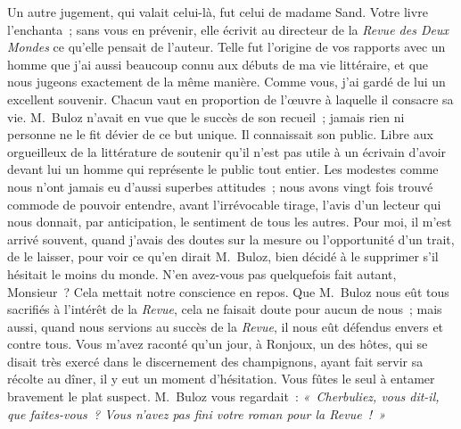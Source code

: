 \documentclass[french,twoside]{book} %
\newcommand\persName[1]{#1}
\newcommand\placeName[1]{#1}
\begin{document}
Un autre jugement, qui valait celui-là, fut celui de madame Sand. Votre livre l’enchanta ; sans vous en prévenir, elle écrivit au directeur de la \emph{Revue des Deux Mondes} ce qu’elle pensait de l’auteur. Telle fut l’origine de vos rapports avec un homme que j’ai aussi beaucoup connu aux débuts de ma vie littéraire, et que nous jugeons exactement de la même manière. Comme vous, j’ai gardé de lui un excellent souvenir. Chacun vaut en proportion de l’œuvre à laquelle il consacre sa vie. {\persName M. Buloz} n’avait en vue que le succès de son recueil ; jamais rien ni personne ne le fit dévier de ce but unique. Il connaissait son public. Libre aux orgueilleux de la littérature de soutenir qu’il n’est pas utile à un écrivain d’avoir devant lui un homme qui représente le public tout entier. Les modestes comme nous n’ont jamais eu d’aussi superbes attitudes ; nous avons vingt fois trouvé commode de pouvoir entendre, avant l’irrévocable tirage, l’avis d’un lecteur qui nous donnait, par anticipation, le sentiment de tous les autres. Pour moi, il m’est arrivé souvent, quand j’avais des doutes sur la mesure ou l’opportunité d’un trait, de le laisser, pour voir ce qu’en dirait {\persName M. Buloz}, bien décidé à le supprimer s’il hésitait le moins du monde. N’en avez-vous pas quelquefois fait autant, Monsieur ? Cela mettait notre conscience en repos. Que {\persName M. Buloz} nous eût tous sacrifiés à l’intérêt de la \emph{Revue}, cela ne faisait doute pour aucun de nous ; mais aussi, quand nous servions au succès de la \emph{Revue}, il nous eût défendus envers et contre tous. Vous m’avez raconté qu’un jour, à {\placeName Ronjoux}, un des hôtes, qui se disait très exercé dans le discernement des champignons, ayant fait servir sa récolte au dîner, il y eut un moment d’hésitation. Vous fûtes le seul à entamer bravement le plat suspect. {\persName M. Buloz} vous regardait : \emph{« {\persName Cherbuliez}, vous dit-il, que faites-vous ? Vous n’avez pas fini votre roman pour la Revue ! »}\par
\end{document}

